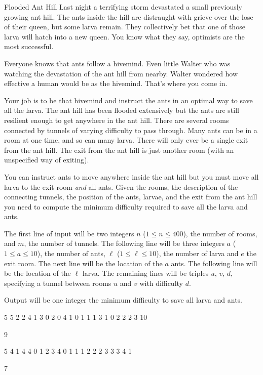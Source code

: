 \begin{problem}{Flooded Ant Hill}
Last night a terrifying storm devastated a small previously growing ant hill.
The ants inside the hill are distraught with grieve over the lose of their queen, but some larva remain.
They collectively bet that one of those larva will hatch into a new queen.
You know what they say, optimists are the most successful.

Everyone knows that ants follow a hivemind.
Even little Walter who was watching the devastation of the ant hill from nearby.
Walter wondered how effective a human would be as the hivemind.
That's where you come in.

Your job is to be that hivemind and instruct the ants in an optimal way to save all the larva.
The ant hill has been flooded extensively but the ants are still resilient enough to get anywhere in the ant hill.
There are several rooms connected by tunnels of varying difficulty to pass through.
Many ants can be in a room at one time, and so can many larva.
There will only ever be a single exit from the ant hill.
The exit from the ant hill is just another room (with an unspecified way of exiting).

You can instruct ants to move anywhere inside the ant hill but you must move all larva to the exit room \textit{and} all ants.
Given the rooms, the description of the connecting tunnels, the position of the ants, larvae, and the exit from the ant hill you need to compute the minimum difficulty required to save all the larva and ants.
\end{problem}

\begin{formalin}
The first line of input will be two integers $n$ ($1 \leq n \leq 400$), the number of rooms, and $m$, the number of tunnels.
The following line will be three integers $a$ ($1 \leq a \leq 10$), the number of ants, $\ell$ ($1 \leq \ell \leq 10$), the number of larva and $e$ the exit room.
The next line will be the location of the $a$ ants.
The following line will be the location of the $\ell$ larva.
The remaining lines will be triples $u$, $v$, $d$, specifying a tunnel between rooms $u$ and $v$ with difficulty $d$.
\end{formalin}

\begin{formalout}
Output will be one integer the minimum difficulty to save all larva and ants.
\end{formalout}

\begin{datain}
5 5
2 2 4
1 3
0 2
0 4 1
0 1 1
1 3 1
0 2 2
2 3 10
\end{datain}
\begin{dataout}
9
\end{dataout}

\begin{datain}
5 4
1 4 4
0
1 2 3 4
0 1 1
1 2 2
2 3 3
3 4 1
\end{datain}
\begin{dataout}
7
\end{dataout}
